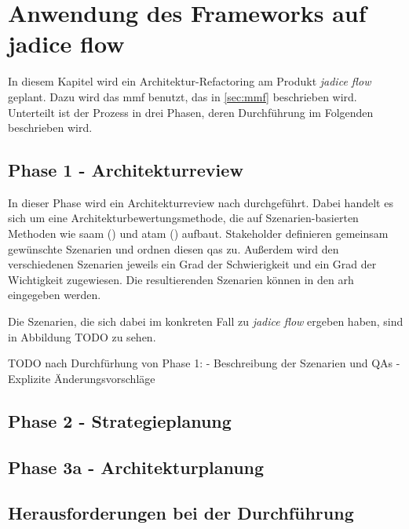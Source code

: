 \chapter{Anwendung des Frameworks auf jadice flow} %
\label{chap:anwendung}

In diesem Kapitel wird ein Architektur-Refactoring am Produkt \emph{jadice flow} geplant.
Dazu wird das \gls{mmf} benutzt, das in \cref{sec:mmf} beschrieben wird.
Unterteilt ist der Prozess in drei Phasen, deren Durchführung im Folgenden beschrieben wird.

\section{Phase 1 - Architekturreview}

In dieser Phase wird ein Architekturreview nach  durchgeführt.
Dabei handelt es sich um eine Architekturbewertungsmethode, die auf Szenarien-basierten Methoden wie \gls{saam} () und \gls{atam} () aufbaut.
Stakeholder definieren gemeinsam gewünschte Szenarien und ordnen diesen \glspl{qa} zu.
Außerdem wird den verschiedenen Szenarien jeweils ein Grad der Schwierigkeit und ein Grad der Wichtigkeit zugewiesen.
Die resultierenden Szenarien können in den \gls{arh} eingegeben werden.

Die Szenarien, die sich dabei im konkreten Fall zu \emph{jadice flow} ergeben haben, sind in Abbildung TODO zu sehen.

TODO nach Durchfürhung von Phase 1: 
 - Beschreibung der Szenarien und QAs
 - Explizite Änderungsvorschläge


\section{Phase 2 - Strategieplanung}
\section{Phase 3a - Architekturplanung}
\section{Herausforderungen bei der Durchführung}
